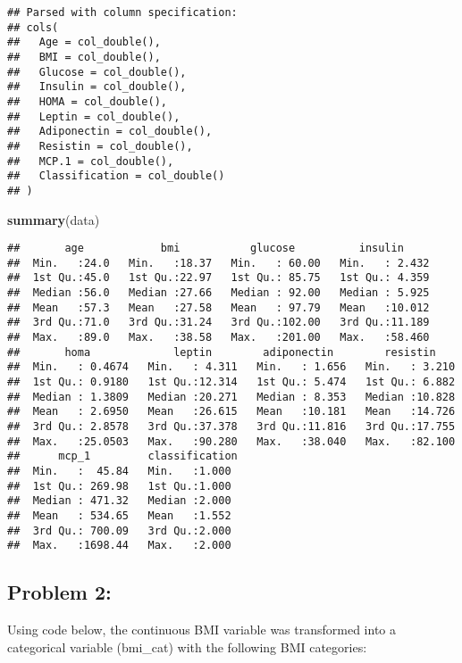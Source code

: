 \documentclass[]{article}
\newenvironment{Shaded}{\begin{snugshade}}{\end{snugshade}}
\newcommand{\KeywordTok}[1]{\textcolor[rgb]{0.13,0.29,0.53}{\textbf{#1}}}
\newcommand{\NormalTok}[1]{#1}
\begin{document}
\begin{verbatim}
## Parsed with column specification:
## cols(
##   Age = col_double(),
##   BMI = col_double(),
##   Glucose = col_double(),
##   Insulin = col_double(),
##   HOMA = col_double(),
##   Leptin = col_double(),
##   Adiponectin = col_double(),
##   Resistin = col_double(),
##   MCP.1 = col_double(),
##   Classification = col_double()
## )
\end{verbatim}

\begin{Shaded}
\begin{Highlighting}[]
\KeywordTok{summary}\NormalTok{(data) }
\end{Highlighting}
\end{Shaded}

\begin{verbatim}
##       age            bmi           glucose          insulin      
##  Min.   :24.0   Min.   :18.37   Min.   : 60.00   Min.   : 2.432  
##  1st Qu.:45.0   1st Qu.:22.97   1st Qu.: 85.75   1st Qu.: 4.359  
##  Median :56.0   Median :27.66   Median : 92.00   Median : 5.925  
##  Mean   :57.3   Mean   :27.58   Mean   : 97.79   Mean   :10.012  
##  3rd Qu.:71.0   3rd Qu.:31.24   3rd Qu.:102.00   3rd Qu.:11.189  
##  Max.   :89.0   Max.   :38.58   Max.   :201.00   Max.   :58.460  
##       homa             leptin        adiponectin        resistin     
##  Min.   : 0.4674   Min.   : 4.311   Min.   : 1.656   Min.   : 3.210  
##  1st Qu.: 0.9180   1st Qu.:12.314   1st Qu.: 5.474   1st Qu.: 6.882  
##  Median : 1.3809   Median :20.271   Median : 8.353   Median :10.828  
##  Mean   : 2.6950   Mean   :26.615   Mean   :10.181   Mean   :14.726  
##  3rd Qu.: 2.8578   3rd Qu.:37.378   3rd Qu.:11.816   3rd Qu.:17.755  
##  Max.   :25.0503   Max.   :90.280   Max.   :38.040   Max.   :82.100  
##      mcp_1         classification 
##  Min.   :  45.84   Min.   :1.000  
##  1st Qu.: 269.98   1st Qu.:1.000  
##  Median : 471.32   Median :2.000  
##  Mean   : 534.65   Mean   :1.552  
##  3rd Qu.: 700.09   3rd Qu.:2.000  
##  Max.   :1698.44   Max.   :2.000
\end{verbatim}

\hypertarget{problem-2}{%
\subsection{Problem 2:}\label{problem-2}}

Using code below, the continuous BMI variable was transformed into a
categorical variable (bmi\_cat) with the following BMI categories:
\end{document}
